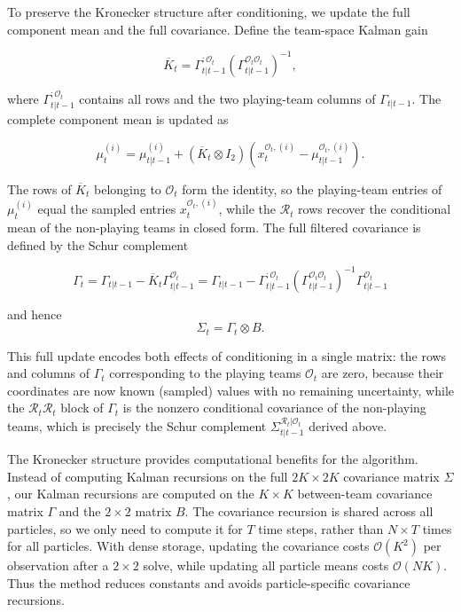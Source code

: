 To preserve the Kronecker structure after conditioning, we update the full component mean and the full covariance. Define the team-space Kalman gain

\begin{equation}
    \overline{K}_t = \Gamma_{t|t-1}^{:\mathcal{O}_t} \left( \Gamma_{t|t-1}^{\mathcal{O}_t\mathcal{O}_t} \right)^{-1}, \nonumber
\end{equation}

where $\Gamma_{t|t-1}^{:\mathcal{O}_t}$ contains all rows and the two playing-team columns of $\Gamma_{t|t-1}$. The complete component mean is updated as

\begin{equation}
    \mu_t^{(i)} = \mu_{t|t-1}^{(i)} + (\overline{K}_t \otimes I_2) \left( x_t^{\mathcal{O}_t,(i)} - \mu_{t|t-1}^{\mathcal{O}_t,(i)} \right). \nonumber
\end{equation}

The rows of $\overline{K}_t$ belonging to $\mathcal{O}_t$ form the identity, so the playing-team entries of $\mu_t^{(i)}$ equal the sampled entries $x_t^{\mathcal{O}_t,(i)}$, while the $\mathcal{R}_t$ rows recover the conditional mean of the non-playing teams in closed form. The full filtered covariance is defined by the Schur complement

\begin{equation}
    \Gamma_t = \Gamma_{t|t-1} - \overline{K}_t \Gamma_{t|t-1}^{\mathcal{O}_t} = \Gamma_{t|t-1} - \Gamma_{t|t-1}^{:\mathcal{O}_t} \left( \Gamma_{t|t-1}^{\mathcal{O}_t\mathcal{O}_t} \right)^{-1} \Gamma_{t|t-1}^{\mathcal{O}_t} \nonumber
\end{equation}

and hence
\begin{equation}
    \Sigma_t = \Gamma_t \otimes B. \nonumber
\end{equation}

This full update encodes both effects of conditioning in a single matrix: the rows and columns of $\Gamma_t$ corresponding to the playing teams $\mathcal{O}_t$ are zero, because their coordinates are now known (sampled) values with no remaining uncertainty, while the $\mathcal{R}_t\mathcal{R}_t$ block of $\Gamma_t$ is the nonzero conditional covariance of the non-playing teams, which is precisely the Schur complement $\Sigma_{t|t-1}^{\mathcal{R}_t|\mathcal{O}_t}$ derived above.

The Kronecker structure provides computational benefits for the algorithm. Instead of computing Kalman recursions on the full $2K \times 2K$ covariance matrix $\Sigma$, our Kalman recursions are computed on the $K \times K$ between-team covariance matrix $\Gamma$ and the $2 \times 2$ matrix $B$. The covariance recursion is shared across all particles, so we only need to compute it for $T$ time steps, rather than $N \times T$ times for all particles. With dense storage, updating the covariance costs $\mathcal{O}(K^2)$ per observation after a $2 \times 2$ solve, while updating all particle means costs $\mathcal{O}(NK)$. Thus the method reduces constants and avoids particle-specific covariance recursions.

